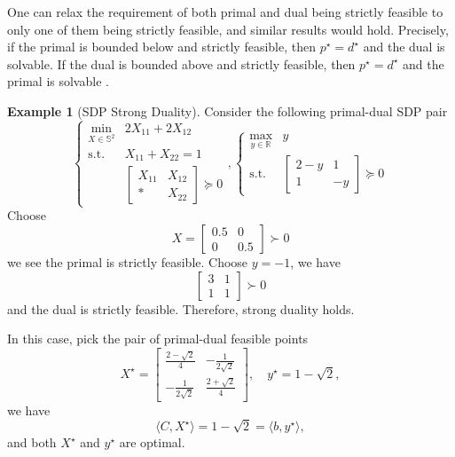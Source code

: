 \documentclass[
]{book}
\theoremstyle{definition}
\theoremstyle{definition}
\newtheorem{example}{Example}[chapter]
\theoremstyle{definition}
\theoremstyle{definition}
\theoremstyle{remark}
\begin{document}
One can relax the requirement of both primal and dual being strictly feasible to only one of them being strictly feasible, and similar results would hold. Precisely, if the primal is bounded below and strictly feasible, then \(p^\star = d^\star\) and the dual is solvable. If the dual is bounded above and strictly feasible, then \(p^\star = d^\star\) and the primal is solvable \citep{nie23book-moment}.

\begin{example}[SDP Strong Duality]
\protect\hypertarget{exm:SuccessSDPDuality}{}\label{exm:SuccessSDPDuality}Consider the following primal-dual SDP pair
\[
\begin{cases}
\min_{X \in \mathbb{S}^{2}} & 2 X_{11} + 2 X_{12} \\
\mathrm{s.t.}& X_{11} + X_{22} = 1 \\
& \begin{bmatrix} X_{11} & X_{12} \\ * & X_{22} \end{bmatrix} \succeq 0 
\end{cases},
\begin{cases}
\max_{y \in \mathbb{R}^{}} & y \\
\mathrm{s.t.}& \begin{bmatrix} 2 - y & 1 \\ 1 & - y \end{bmatrix} \succeq 0
\end{cases}
\]
Choose
\[
X = \begin{bmatrix} 0.5 & 0 \\ 0 & 0.5 \end{bmatrix} \succ 0
\]
we see the primal is strictly feasible.
Choose \(y = -1\), we have
\[
\begin{bmatrix} 3 & 1 \\ 1 & 1 \end{bmatrix} \succ 0
\]
and the dual is strictly feasible. Therefore, strong duality holds.

In this case, pick the pair of primal-dual feasible points
\[
X^\star = \begin{bmatrix} \frac{2 - \sqrt{2}}{4} & - \frac{1}{2 \sqrt{2}} \\ - \frac{1}{2 \sqrt{2}} & \frac{2 + \sqrt{2}}{4} \end{bmatrix}, \quad y^\star = 1 - \sqrt{2},
\]
we have
\[
\langle C, X^\star \rangle = 1-\sqrt{2} = \langle b, y^\star \rangle,
\]
and both \(X^\star\) and \(y^\star\) are optimal.
\end{example}
\end{document}
